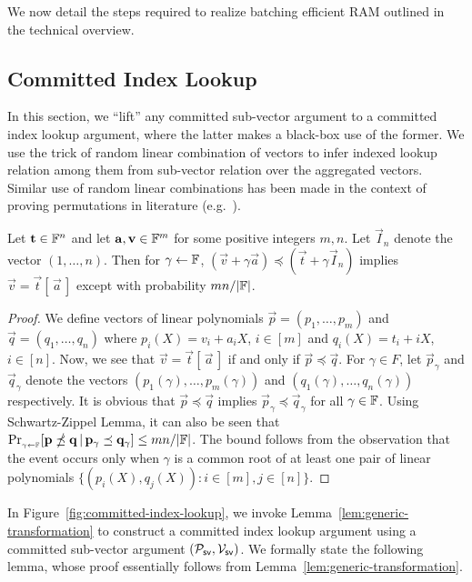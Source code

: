 We now detail the steps required to realize batching efficient RAM outlined in the technical overview.

\subsection{Committed Index Lookup}\label{subsec:committed-index-lookup}
In this section, we ``lift'' any committed sub-vector argument to a committed index lookup argument, where
the latter makes a black-box use of the former. We use the trick of random linear combination of vectors to infer
indexed lookup relation among them from sub-vector relation over the aggregated vectors. Similar use of random
 linear combinations has been made in the context of proving permutations in literature (e.g.~\cite{SCN:GOTV22}).

\begin{lemma}\label{lem:generic-transformation}
Let $\mathbf{t}\in \mathbb{F}^n$ and let $\mathbf{a},\mathbf{v}\in \mathbb{F}^m$ for some positive integers $m,n$. Let $\vec{I}_n$ denote the vector $(1,\ldots,n)$.
Then for $\gamma\gets \mathbb{F}$, $(\vec{v}+\gamma \vec{a})\preceq (\vec{t} + \gamma \vec{I}_n)$ implies
$\vec{v}=\vec{t}[\,\vec{a}\,]$ except with probability $mn/|\mathbb{F}|$.
\end{lemma}
\begin{proof}
We define vectors of linear polynomials $\vec{p}=(p_1,\ldots,p_m)$ and $\vec{q}=(q_1,\ldots,q_n)$ where
$p_i(X) = v_i + a_i X$, $i\in [m]$ and $q_i(X) = t_i + i X$, $i\in [n]$. Now, we see that $\vec{v}=\vec{t}[\,\vec{a}\,]$
if and only if $\vec{p}\preceq \vec{q}$. For $\gamma\in F$, let $\vec{p}_\gamma$ and $\vec{q}_\gamma$ denote the vectors
$(p_1(\gamma),\ldots,p_m(\gamma))$ and $(q_1(\gamma),\ldots,q_n(\gamma))$ respectively. It is obvious that $\vec{p}\preceq \vec{q}$
implies $\vec{p}_\gamma\preceq \vec{q}_\gamma$ for all $\gamma\in \mathbb{F}$. Using Schwartz-Zippel Lemma, it can also be seen that
$\Pr_{{}_{\gamma\gets \mathbb{F}}}[\mathbf{p}\npreceq \mathbf{q} \,|\, \mathbf{p}_\gamma\preceq \mathbf{q}_\gamma]\leq mn/|\mathbb{F}|$. The bound
follows from the observation that the event occurs only when $\gamma$ is a common root of at least one pair of linear polynomials
$\{(p_i(X),q_j(X)): i\in [m], j\in [n]\}$.
\end{proof}
In Figure~\ref{fig:committed-index-lookup}, we invoke Lemma~\ref{lem:generic-transformation} to construct a
committed index lookup argument using a committed sub-vector argument $(\mathcal{P}_{\mathsf{sv}},\mathcal{V}_{\mathsf{sv}})$. We formally
state the following lemma, whose proof essentially follows from Lemma~\ref{lem:generic-transformation}.

